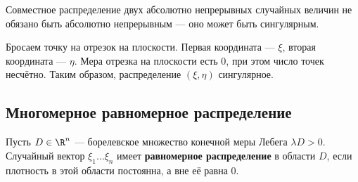 \begin{remark}
    Совместное распределение двух абсолютно непрерывных случайных величин не обязано быть абсолютно непрерывным --- оно может быть сингулярным.
\end{remark}

\begin{example}
    Бросаем точку на отрезок на плоскости. Первая координата --- \(\xi\), вторая координата --- \(\eta\). Мера отрезка на плоскости есть 0, при этом число точек несчётно. Таким образом, распределение \((\xi, \eta)\) сингулярное.
\end{example}

\subsection{Многомерное равномерное распределение}

\begin{definition}
    Пусть \(D \in \R^n\) --- борелевское множество конечной меры Лебега \(\lambda D > 0\). Случайный вектор \(\xi_1 \dots \xi_n\) имеет \textbf{равномерное распределение} в области \(D\), если плотность в этой области постоянна, а вне её равна \(0\).
\end{definition}
